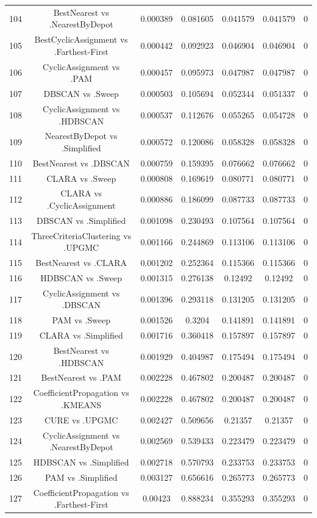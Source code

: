 \documentclass[a4paper,10pt]{article}
\begin{document}
\begin{landscape}
\begin{table}[!htp]
\begin{tabular}{ccccccc}
104&BestNearest vs .NearestByDepot&0.000389&0.081605&0.041579&0.041579&0\\
105&BestCyclicAssignment vs .Farthest-First&0.000442&0.092923&0.046904&0.046904&0\\
106&CyclicAssignment vs .PAM&0.000457&0.095973&0.047987&0.047987&0\\
107&DBSCAN vs .Sweep&0.000503&0.105694&0.052344&0.051337&0\\
108&CyclicAssignment vs .HDBSCAN&0.000537&0.112676&0.055265&0.054728&0\\
109&NearestByDepot vs .Simplified&0.000572&0.120086&0.058328&0.058328&0\\
110&BestNearest vs .DBSCAN&0.000759&0.159395&0.076662&0.076662&0\\
111&CLARA vs .Sweep&0.000808&0.169619&0.080771&0.080771&0\\
112&CLARA vs .CyclicAssignment&0.000886&0.186099&0.087733&0.087733&0\\
113&DBSCAN vs .Simplified&0.001098&0.230493&0.107564&0.107564&0\\
114&ThreeCriteriaClustering vs .UPGMC&0.001166&0.244869&0.113106&0.113106&0\\
115&BestNearest vs .CLARA&0.001202&0.252364&0.115366&0.115366&0\\
116&HDBSCAN vs .Sweep&0.001315&0.276138&0.12492&0.12492&0\\
117&CyclicAssignment vs .DBSCAN&0.001396&0.293118&0.131205&0.131205&0\\
118&PAM vs .Sweep&0.001526&0.3204&0.141891&0.141891&0\\
119&CLARA vs .Simplified&0.001716&0.360418&0.157897&0.157897&0\\
120&BestNearest vs .HDBSCAN&0.001929&0.404987&0.175494&0.175494&0\\
121&BestNearest vs .PAM&0.002228&0.467802&0.200487&0.200487&0\\
122&CoefficientPropagation vs .KMEANS&0.002228&0.467802&0.200487&0.200487&0\\
123&CURE vs .UPGMC&0.002427&0.509656&0.21357&0.21357&0\\
124&CyclicAssignment vs .NearestByDepot&0.002569&0.539433&0.223479&0.223479&0\\
125&HDBSCAN vs .Simplified&0.002718&0.570793&0.233753&0.233753&0\\
126&PAM vs .Simplified&0.003127&0.656616&0.265773&0.265773&0\\
127&CoefficientPropagation vs .Farthest-First&0.00423&0.888234&0.355293&0.355293&0\\

\end{tabular}
\end{table}
\end{landscape}
\end{document}
